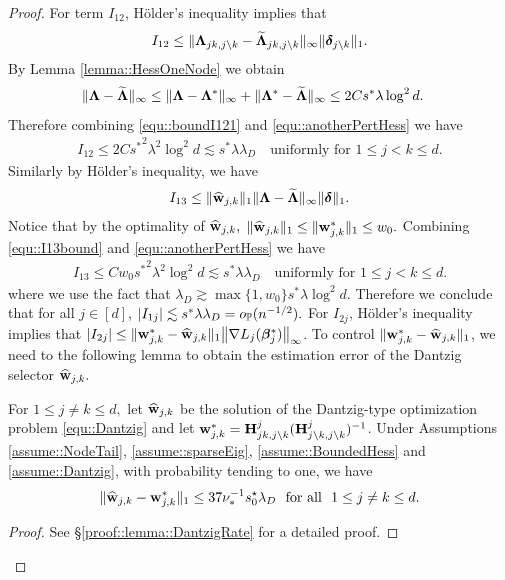 \documentclass[twoside,11pt]{article}
\newcommand*{\bbetas}{\bbeta^*}
\newcommand*{\hw}{\hat{\wb}}
\newcommand*{\sw}{\wb^*}
\begin{document}
\begin{proof}
For term $I_{12}$, H\"{o}lder's inequality implies that 
\begin{align}\label{equ::boundI121}
I_{12} \leq   \|\bm{\Lambda}_{jk,j\setminus k}  -\widetilde {\bm{\Lambda}}_{jk,j\setminus k} \|_\infty   \| \bm{\delta}_{j \setminus k}   \|_1.
\end{align}
 By  Lemma \ref{lemma::HessOneNode} we obtain 
\begin{align}\label{equ::anotherPertHess}
 & \| \bm{\Lambda} - \widetilde {\bm{\Lambda}}  \|_\infty \leq  \| \bm{\Lambda} - \bm{\Lambda} ^* \|_\infty  + \|\bm{\Lambda} ^* - \widetilde {\bm{\Lambda}}  \|_\infty \leq 2 Cs ^* \lambda \log^2 d.
\end{align}
Therefore  combining \eqref{equ::boundI121} and \eqref{equ::anotherPertHess} we have 
\begin{align*}
I_{12} \leq 2C {s^*}^2  \lambda ^2 \log^2 d \lesssim s^*\lambda \lambda_D\quad \text{uniformly for } 1\leq j < k \leq d.
\end{align*}
Similarly by H\"{o}lder's inequality, we have  
\begin{align}\label{equ::I13bound}
I_{13} \leq  \| \hw_{j,k} \|_1  \| \bLambda - \tilde \bLambda \|_\infty \|\bdelta\|_ 1.
\end{align}
Notice that by the optimality of $\hw_{j,k},$ $ \| \hw_{j,k} \|_1  \leq  \| \sw_{j,k} \|_1 \leq w_0.$ Combining \eqref{equ::I13bound} and \eqref{equ::anotherPertHess} we have
\begin{align*}%
I_{13} \leq Cw_0{s^*}^2 \lambda^2 \log^2 d\lesssim  s^* \lambda \lambda_D  \quad \text{uniformly for } 1\leq j < k \leq d.
\end{align*}
where we use the fact that $\lambda_D \gtrsim \max\{1,w_0\} s^* \lambda\log^2 d.$
Therefore we  conclude that  for all $j\in [d]$,
$
| I_{1j} | \lesssim s^* \lambda\lambda_D = o_{\mathbb{P}}(n^{-1/2}).
$
For $I_{2j}$, H\"{o}lder's inequality implies that $| I_{2j} |  \leq   \| \sw _{j,k}- \hw_{j,k}\|_{1} \bigl \| \nabla L_j(\bbetas_j)\bigr \|_{\infty } $. 
To control $\| \sw _{j,k}- \hw_{j,k}\|_{1}$, we need to the following lemma to obtain the estimation error of the Dantzig selector $\hw_{j,k}.$
\begin{lemma}\label{lemma::DantzigRate}
For $1\leq j\neq k\leq d,$  let $\hw_{j,k}$ be the solution of the Dantzig-type optimization problem \eqref{equ::Dantzig} and let ${\sw_{j,k}} = \Hb_{jk, j\setminus k}^{j} (\Hb_{j\setminus k,j\setminus k}^{j})^{-1}$. Under Assumptions \ref{assume::NodeTail}, \ref{assume::sparseEig}, \ref{assume::BoundedHess}  and \ref{assume::Dantzig}, with probability tending to one,
 we have 
$$
  \| \hw_{j,k} - \sw_{j,k}   \|_1\leq 37 \nu_*^{-1} s_0^\star\lambda_D~~\text{for all}~~1\leq j\neq k\leq d.
$$
\end{lemma}
\begin{proof} See \S \ref{proof::lemma::DantzigRate} for a detailed proof.
\end{proof}


\end{proof}
\end{document}
